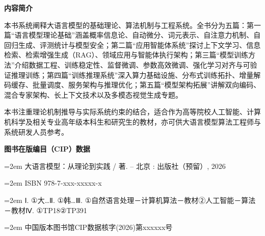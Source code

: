 \thispagestyle{empty}

\vspace*{2mm}

\begin{center}
\begin{minipage}{0.94\textwidth}
\small\linespread{1.35}\selectfont
\setlength{\parindent}{2em}
{\centering\heiti\bfseries 内\quad 容\quad 简\quad 介\par}
\vspace{2mm}
本书系统阐释大语言模型的基础理论、算法机制与工程系统。全书分为五篇：第一篇“语言模型理论基础”涵盖概率信息论、自动微分、词元表示、自注意力机制、自回归生成、评测统计与模型安全；第二篇“应用智能体系统”探讨上下文学习、信息检索、检索增强生成（RAG）、领域应用与智能体执行架构；第三篇“模型训练方法”介绍数据工程、训练稳定性、监督微调、参数高效微调、强化学习对齐与可验证推理训练；第四篇“训练推理系统”深入算力基础设施、分布式训练拓扑、增量解码缓存、批量调度、服务架构与推理优化；第五篇“模型架构拓展”讲解双向编码、混合专家架构、长上下文技术以及多模态视觉生成专题。

本书注重理论机制推导与实际系统约束的结合，适合作为高等院校人工智能、计算机科学及相关专业高年级本科生和研究生的教材，亦可供大语言模型算法工程师与系统研发人员参考。
\end{minipage}
\end{center}

\vspace{4mm}

\begin{center}
\begin{tcolorbox}[
  enhanced,
  width=0.94\textwidth,
  boxrule=0.5pt,
  arc=0mm,
  colback=white,
  colframe=MyNavy,
  left=5mm,
  right=5mm,
  top=4mm,
  bottom=4mm
]
\setlength{\parindent}{0pt}
\small\linespread{1.35}\selectfont

{\centering\textbf{\heiti 图书在版编目（CIP）数据}\par}
\vspace{2.8mm}

\hangindent=2em
大语言模型：从理论到实践 / \bookauthor 著. -- 北京 : 出版社（预留）, 2026\par
\vspace{1.2mm}
\hangindent=2em
ISBN 978-7-xxx-xxxxx-x\par
\vspace{2.8mm}

\hangindent=2em
Ⅰ. ①大…\quad Ⅱ. ①韩…\quad Ⅲ. ①自然语言处理－计算机算法－教材\quad ②人工智能－算法－教材\quad Ⅳ. ①TP18\quad ②TP391\par
\vspace{2.8mm}

\hangindent=2em
中国版本图书馆CIP数据核字(2026)第xxxxxx号\par
\end{tcolorbox}
\end{center}


